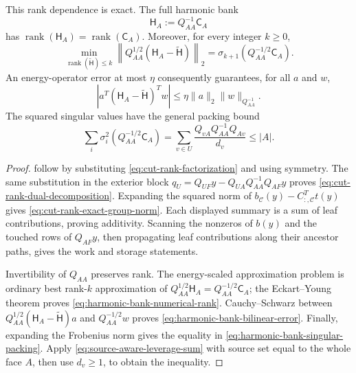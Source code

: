 \begin{theorem}
This rank dependence is exact.  The full harmonic bank
\begin{equation*}
 \mathsf H_A:=Q_{AA}^{-1}\mathsf C_A
\end{equation*}
has $\operatorname{rank}(\mathsf H_A)=
\operatorname{rank}(\mathsf C_A)$.  Moreover, for every integer $k\geq0$,
\begin{equation}
 \min_{\operatorname{rank}(\widetilde{\mathsf H})\leq k}
 \left\|Q_{AA}^{1/2}
   (\mathsf H_A-\widetilde{\mathsf H})\right\|_2
 =\sigma_{k+1}\!\left(Q_{AA}^{-1/2}\mathsf C_A\right).
 \label{eq:harmonic-bank-numerical-rank}
\end{equation}
An energy-operator error at most $\eta$ consequently guarantees, for all
$a$ and $w$,
\begin{equation}
 \left|a^T(\mathsf H_A-\widetilde{\mathsf H})^Tw\right|
 \leq\eta\|a\|_2\|w\|_{Q_{AA}^{-1}}.
 \label{eq:harmonic-bank-bilinear-error}
\end{equation}
The squared singular values have the general packing bound
\begin{equation}
 \sum_i\sigma_i^2\!\left(Q_{AA}^{-1/2}\mathsf C_A\right)
 =\sum_{v\in U}
   \frac{Q_{vA}Q_{AA}^{-1}Q_{Av}}{d_v}
 \leq |A|.
 \label{eq:harmonic-bank-singular-packing}
\end{equation}
\end{theorem}

\begin{proof}
 follow by
substituting \cref{eq:cut-rank-factorization} and using symmetry.  The same
substitution in the exterior block
$q_U=Q_{UF}y-Q_{UA}Q_{AA}^{-1}Q_{AF}y$ proves
\cref{eq:cut-rank-dual-decomposition}.  Expanding the squared norm of
$b_{\mathcal C}(y)-C_{:,\mathcal C}^Tt(y)$ gives
\cref{eq:cut-rank-exact-group-norm}.  Each displayed summary is a sum of
leaf contributions, proving additivity.  Scanning the nonzeros of $b(y)$ and
the touched rows of $Q_{AF}y$, then propagating leaf contributions along
their ancestor paths, gives the work and storage statements.

Invertibility of $Q_{AA}$ preserves rank.  The energy-scaled approximation
problem is ordinary best rank-$k$ approximation of
$Q_{AA}^{1/2}\mathsf H_A=Q_{AA}^{-1/2}\mathsf C_A$; the
Eckart--Young theorem proves
\cref{eq:harmonic-bank-numerical-rank}.  Cauchy--Schwarz between
$Q_{AA}^{1/2}(\mathsf H_A-\widetilde{\mathsf H})a$ and
$Q_{AA}^{-1/2}w$ proves \cref{eq:harmonic-bank-bilinear-error}.  Finally,
expanding the Frobenius norm gives the equality in
\cref{eq:harmonic-bank-singular-packing}.  Apply
\cref{eq:source-aware-leverage-sum} with source set equal to the whole face
$A$, then use $d_v\geq1$, to obtain the inequality.
\end{proof}

